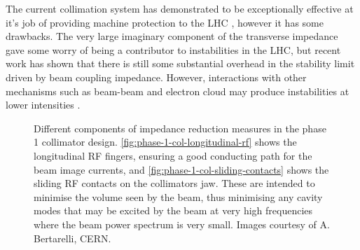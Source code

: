 The current collimation system has demonstrated to be exceptionally effective at it's job of providing machine protection to the LHC \cite{Zerlauth:MP}, however it has some drawbacks. The very large imaginary component of the transverse impedance gave some worry of being a contributor to instabilities in the LHC, but recent work has shown that there is still some substantial overhead in the stability limit driven by beam coupling impedance. However, interactions with other mechanisms such as beam-beam and electron cloud may produce instabilities at lower intensities \cite{Mounet:PhDThesis}. 

\begin{figure}
\caption{Different components of impedance reduction measures in the phase 1 collimator design. \ref{fig:phase-1-col-longitudinal-rf} shows the longitudinal RF fingers, ensuring a good conducting path for the beam image currents, and \ref{fig:phase-1-col-sliding-contacts} shows the sliding RF contacts on the collimators jaw. These are intended to minimise the volume seen by the beam, thus minimising any cavity modes that may be excited by the beam at very high frequencies where the beam power spectrum is very small. Images courtesy of A. Bertarelli, CERN.}
\label{fig:phase-1-rf}
\end{figure}

